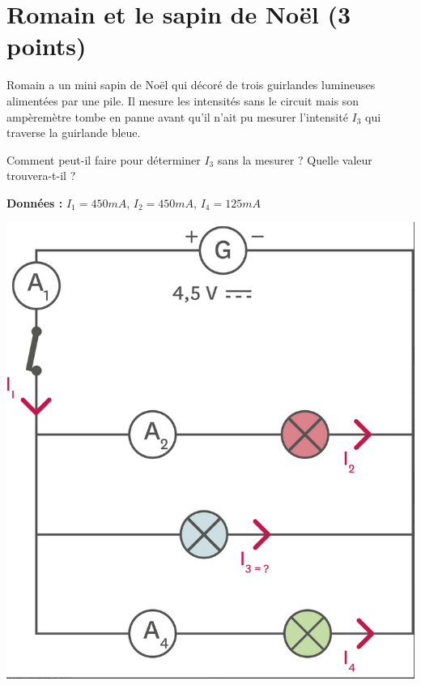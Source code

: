 \section{Romain et le sapin de Noël (3 points)}

	Romain a un mini sapin de Noël qui décoré de trois guirlandes lumineuses alimentées par une pile. Il mesure les intensités sans le circuit mais son ampèremètre tombe en panne avant qu'il n'ait pu mesurer l'intensité $I_3$ qui traverse la guirlande bleue.
	
	\begin{questions}
		\question Comment peut-il faire pour déterminer $I_3$ sans la mesurer ? 
		\question Quelle valeur trouvera-t-il ?
	\end{questions}

\textbf{Données : } $I_1 = 450 mA$, $I_2 = 450 mA$, $I_4 = 125 mA$

\begin{center}
	\includegraphics[scale=0.5]{img/sapin}
\end{center}
